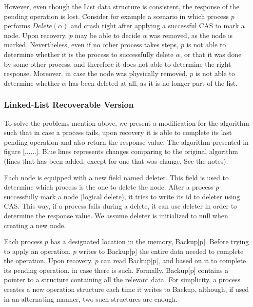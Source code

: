 However, even though the List data structure is consistent, the response of the pending operation is lost. Consider for example a scenario in which process $p$ performs $Delete(\alpha)$ and crash right after applying a successful CAS to mark a node. Upon recovery, $p$ may be able to decide $\alpha$ was removed, as the node is marked. Nevertheless, even if no other process takes steps, $p$ is not able to determine whether it is the process to successfully delete $\alpha$, or that it was done by some other process, and therefore it does not able to determine the right response. Moreover, in case the node was physically removed, $p$ is not able to determine whether $\alpha$ has been deleted at all, as it is no longer part of the list.


\subsubsection{Linked-List Recoverable Version}

To solve the problems mention above, we present a modification for the algorithm such that in case a process fails, upon recovery it is able to complete its last pending operation and also return the response value. The algorithm presented in figure [......]. Blue lines represents changes comparing to the original algorithm (lines that has been added, except for one that was change. See the notes).

Each node is equipped with a new field named deleter. This field is used to determine which process is the one to delete the node. After a process $p$ successfully mark a node (logical delete), it tries to write its id to deleter using CAS. This way, if a process fails during a delete, it can use deleter in order to determine the response value. We assume deleter is initialized to null when creating a new node.

Each process $p$ has a designated location in the memory, Backup[p]. Before trying to apply an operation, $p$ writes to Backup[p] the entire data needed to complete the operation. Upon recovery, $p$ can read Backup[p], and based on it to complete its pending operation, in case there is such. Formally, Backup[p] contains a pointer to a structure containing all the relevant data.
For simplicity, a process creates a new operation structure each time it writes to Backup, although, if used in an alternating manner, two such structures are enough.  


